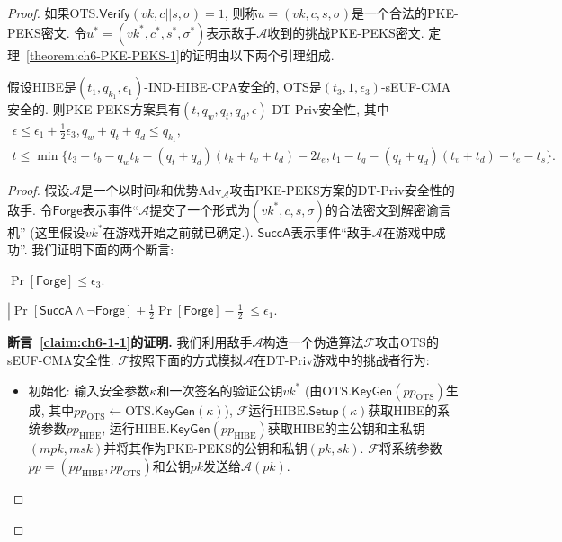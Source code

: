 \begin{proof}
如果$\text{OTS}.\mathsf{Verify}(vk, c||s, \sigma) = 1$, 则称$u = (vk, c, s, \sigma)$是一个合法的PKE-PEKS密文. 令$u^* = (vk^*, c^*, s^*, \sigma^*)$表示敌手$\mathcal{A}$收到的挑战PKE-PEKS密文. 定理~\ref{theorem:ch6-PKE-PEKS-1}的证明由以下两个引理组成.
\begin{lemma}\label{lemma:ch6-1}
假设HIBE是$(t_1, q_{k_1}, \epsilon_1)$-IND-HIBE-CPA安全的, OTS是$(t_3, 1, \epsilon_3)$-sEUF-CMA安全的. 则PKE-PEKS方案具有$(t, q_w, q_t, q_d, \epsilon)$-DT-Priv安全性, 其中
\[ 
\begin{array}{l}
	\epsilon \leq \epsilon_1 + \frac{1}{2}\epsilon_3, q_w + q_t + q_d \leq q_{k_1},\\
	t \leq \min\{t_3 - t_b - q_wt_k - (q_t+q_d)(t_k+t_v+t_d) - 2t_e, t_1 - t_g - (q_t+q_d)(t_v+t_d) - t_e - t_s\}.
\end{array}
\]
\end{lemma}
\begin{proof}
假设$\mathcal{A}$是一个以时间$t$和优势$\text{Adv}_\mathcal{A}$攻击PKE-PEKS方案的DT-Priv安全性的敌手. 令$\mathsf{Forge}$表示事件``$\mathcal{A}$提交了一个形式为$(vk^*, c, s, \sigma)$的合法密文到解密谕言机'' (这里假设$vk^*$在游戏开始之前就已确定.). $\mathsf{SuccA}$表示事件``敌手$\mathcal{A}$在游戏中成功''. 我们证明下面的两个断言:
\begin{claim}\label{claim:ch6-1-1}
	$\Pr[\mathsf{Forge}] \leq \epsilon_3$.
\end{claim}

\begin{claim}\label{claim:ch6-1-2}
	$|\Pr[\mathsf{SuccA} \wedge \neg\mathsf{Forge}] + \frac{1}{2} \Pr[\mathsf{Forge}] - \frac{1}{2}| \leq \epsilon_1$.
\end{claim}  

\begin{trivlist}
	\item \textbf{断言~\ref{claim:ch6-1-1}的证明.} 我们利用敌手$\mathcal{A}$构造一个伪造算法$\mathcal{F}$攻击OTS的sEUF-CMA安全性. 	$\mathcal{F}$按照下面的方式模拟$\mathcal{A}$在DT-Priv游戏中的挑战者行为: 
\begin{itemize}
\item 初始化: 输入安全参数$\kappa$和一次签名的验证公钥$vk^*$ (由$\text{OTS}.\mathsf{KeyGen}(pp_{\text{OTS}})$生成, 其中$pp_{\text{OTS}} \leftarrow \text{OTS}.\mathsf{KeyGen}(\kappa)$), 
		$\mathcal{F}$运行$\text{HIBE}.\mathsf{Setup}(\kappa)$获取HIBE的系统参数$pp_{\text{HIBE}}$, 运行$\text{HIBE}.\mathsf{KeyGen}(pp_{\text{HIBE}})$获取HIBE的主公钥和主私钥$(mpk, msk)$并将其作为PKE-PEKS的公钥和私钥$(pk, sk)$. $\mathcal{F}$将系统参数$pp = (pp_{\text{HIBE}}, pp_{\text{OTS}})$和公钥$pk$发送给$\mathcal{A}(pk)$. 


\end{itemize}
\end{trivlist}
\end{proof}
\end{proof}
